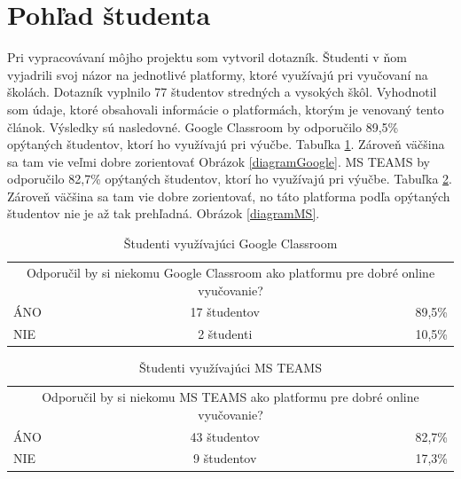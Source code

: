 \documentclass[10pt,slovak,a4paper]{article}
\begin{document}
\section{Pohľad študenta} \label{pohľad studenta}
Pri vypracovávaní môjho projektu som vytvoril dotazník. Študenti v ňom vyjadrili svoj názor na jednotlivé platformy, ktoré využívajú pri vyučovaní na školách. Dotazník vyplnilo 77 študentov stredných a vysokých škôl. Vyhodnotil som údaje, ktoré obsahovali informácie o platformách, ktorým je venovaný tento článok. Výsledky sú nasledovné. Google Classroom by odporučilo 89,5\% opýtaných študentov, ktorí ho využívajú pri výučbe. Tabuľka \ref{tab:tabulkaGoogle}. Zároveň väčšina sa tam vie veľmi dobre zorientovať Obrázok \ref{diagramGoogle}. MS TEAMS by odporučilo 82,7\% opýtaných študentov, ktorí ho využívajú pri výučbe. Tabuľka \ref{tab:tabulkaMS}. Zároveň väčšina sa tam vie dobre zorientovať, no táto platforma podľa opýtaných študentov nie je až tak prehľadná.  Obrázok \ref{diagramMS}.


\begin{table}[htbp]
  \centering
  \caption{Študenti využívajúci Google Classroom}
    \begin{tabular}{|l|cc|r|}
    \toprule
    \multicolumn{4}{|c|}{\multirow{2}[2]{*}{Odporučil by si niekomu Google Classroom ako platformu pre dobré online vyučovanie?}} \\
    \multicolumn{4}{|c|}{} \\
    \midrule
    ÁNO   & \multicolumn{2}{c|}{17 študentov} & 89,5\% \\
    \midrule
    NIE   & \multicolumn{2}{c|}{2 študenti} & 10,5\% \\
    \bottomrule
    \end{tabular}%
  \label{tab:tabulkaGoogle}%
\end{table}%


\begin{table}[htbp]
  \centering
  \caption{Študenti využívajúci MS TEAMS}
    \begin{tabular}{|l|cc|r|}
    \toprule
    \multicolumn{4}{|c|}{\multirow{2}[2]{*}{Odporučil by si niekomu MS TEAMS ako platformu pre dobré online vyučovanie?}} \\
    \multicolumn{4}{|c|}{} \\
    \midrule
    ÁNO   & \multicolumn{2}{c|}{43 študentov} & 82,7\% \\
    \midrule
    NIE   & \multicolumn{2}{c|}{9 študentov} & 17,3\% \\
    \bottomrule
    \end{tabular}%
  \label{tab:tabulkaMS}%
\end{table}%
\end{document}
